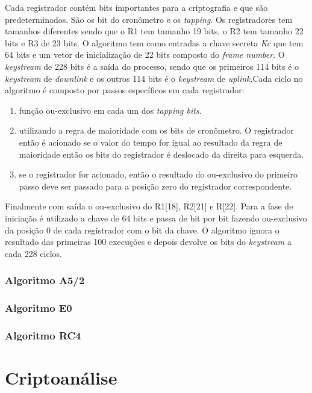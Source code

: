 Cada registrador contém bits importantes para a criptografia e que são predeterminados. São os bit do cronômetro e os \textit{tapping}. Os registradores tem tamanhos diferentes sendo que o R1 tem tamanho 19 bits, o R2 tem tamanho 22 bits e R3 de 23 bits. O algoritmo tem como entradas a chave secreta \textit{Kc} que tem 64 bits e um vetor de inicialização de 22 bits composto do \textit{frame number}. O \textit{keystream} de 228 bits é a saída do processo, sendo que os primeiros 114 bits é o \textit{keystream} de \textit{downlink} e os outros 114 bits é o \textit{keystream} de \textit{uplink}.Cada ciclo no algoritmo é composto por passos específicos em cada registrador:

\begin{enumerate}
\item função ou-exclusivo em cada um dos \textit{tapping bits}.
\item utilizando a regra de maioridade com os bits de cronômetro. O registrador então é acionado se o valor do tempo for igual ao resultado da regra de maioridade então os bits do registrador é deslocado da direita para esquerda.
\item se o registrador for acionado, então o resultado do ou-exclusivo do primeiro passo deve ser passado para a posição zero do registrador correspondente.
\end{enumerate}

Finalmente com saída o ou-exclusivo do R1[18], R2[21] e R[22]. Para a fase de iniciação é utilizado a chave de 64 bits e passa de bit por bit fazendo ou-exclusivo da posição 0 de cada registrador com o bit da chave. O algoritmo ignora o resultado das primeiras 100 execuções e depois devolve os bits do \textit{keystream} a cada 228 ciclos.
\subsubsection{Algoritmo A5/2}
\label{algorithm-a52}

\subsubsection{Algoritmo E0}
\label{algorithm-e0}

\subsubsection{Algoritmo RC4}
\label{algorithm-rc4}

\section{Criptoanálise}